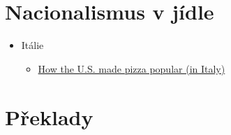 \section{Nacionalismus v jídle}\label{Nacionalismusux20vux20juxeddle}

\begin{itemize}
\tightlist
\item
  Itálie

  \begin{itemize}
  \tightlist
  \item
    \href{https://www.youtube.com/watch?v=iZZfwyKa0Lc}{How the U.S. made
    pizza popular (in Italy)}
  \end{itemize}
\end{itemize}
\section{Překlady}




